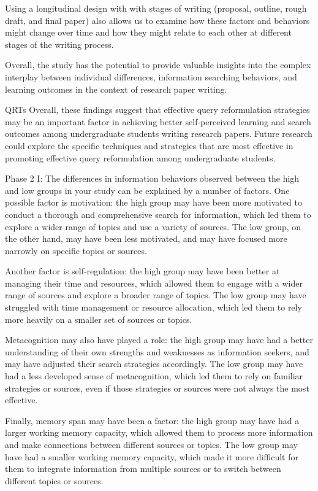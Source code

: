 \documentclass[letterpaper, nobind]{templates/ociamthesis}
\begin{document}
Using a longitudinal design with with stages of writing (proposal, outline, rough draft, and final paper) also allows us to examine how these factors and behaviors might change over time and how they might relate to each other at different stages of the writing process.

Overall, the study has the potential to provide valuable insights into the complex interplay between individual differences, information searching behaviors, and learning outcomes in the context of research paper writing.

QRTs
Overall, these findings suggest that effective query reformulation strategies may be an important factor in achieving better self-perceived learning and search outcomes among undergraduate students writing research papers. Future research could explore the specific techniques and strategies that are most effective in promoting effective query reformulation among undergraduate students.

Phase 2 I:
The differences in information behaviors observed between the high and low groups in your study can be explained by a number of factors. One possible factor is motivation: the high group may have been more motivated to conduct a thorough and comprehensive search for information, which led them to explore a wider range of topics and use a variety of sources. The low group, on the other hand, may have been less motivated, and may have focused more narrowly on specific topics or sources.

Another factor is self-regulation: the high group may have been better at managing their time and resources, which allowed them to engage with a wider range of sources and explore a broader range of topics. The low group may have struggled with time management or resource allocation, which led them to rely more heavily on a smaller set of sources or topics.

Metacognition may also have played a role: the high group may have had a better understanding of their own strengths and weaknesses as information seekers, and may have adjusted their search strategies accordingly. The low group may have had a less developed sense of metacognition, which led them to rely on familiar strategies or sources, even if those strategies or sources were not always the most effective.

Finally, memory span may have been a factor: the high group may have had a larger working memory capacity, which allowed them to process more information and make connections between different sources or topics. The low group may have had a smaller working memory capacity, which made it more difficult for them to integrate information from multiple sources or to switch between different topics or sources.
\end{document}
